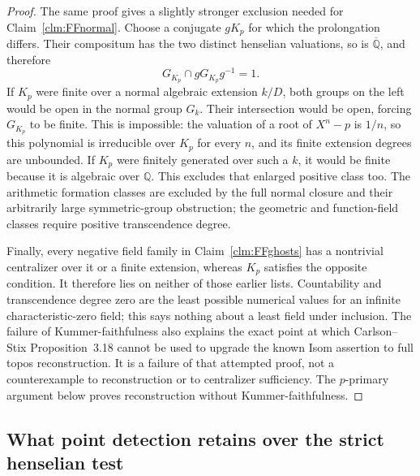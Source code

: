 \documentclass[11pt]{article}
\begin{document}
\begin{proof}
The same proof gives a slightly stronger exclusion needed
for Claim~\ref{clm:FFnormal}. Choose a conjugate
\(gK_p\) for which the prolongation differs. Their
compositum has the two distinct henselian valuations,
so is \(\overline{\mathbb Q}\), and therefore
\[
                   G_{K_p}\cap gG_{K_p}g^{-1}=1.          \tag{F.23.1}
\]
If \(K_p\) were finite over a normal algebraic extension
\(k/D\), both groups on the left would be open in the
normal group \(G_k\). Their intersection would be open,
forcing \(G_{K_p}\) to be finite. This is impossible:
the valuation of a root of \(X^n-p\) is \(1/n\),
so this polynomial is irreducible over \(K_p\) for every
\(n\), and its finite extension degrees are unbounded.
If \(K_p\) were finitely generated over such a \(k\),
it would be finite because it is algebraic over
\(\mathbb Q\). This excludes that enlarged positive
class too. The arithmetic formation classes are excluded
by the full normal closure and their arbitrarily large
symmetric-group obstruction; the geometric and function-field
classes require positive transcendence degree.

Finally, every negative field family in
Claim~\ref{clm:FFghosts} has a nontrivial centralizer over
it or a finite extension, whereas \(K_p\) satisfies
the opposite condition. It therefore lies on neither
of those earlier lists. Countability and transcendence
degree zero are the least possible numerical values
for an infinite characteristic-zero field; this says
nothing about a least field under inclusion. The failure
of Kummer-faithfulness also explains the exact point at
which Carlson--Stix Proposition~3.18 cannot be used to
upgrade the known Isom assertion to full topos reconstruction.
It is a failure of that attempted proof, not a counterexample
to reconstruction or to centralizer sufficiency. The
\(p\)-primary argument below proves reconstruction
without Kummer-faithfulness.
\end{proof}

\subsection{What point detection retains over the strict henselian test}
\end{document}
